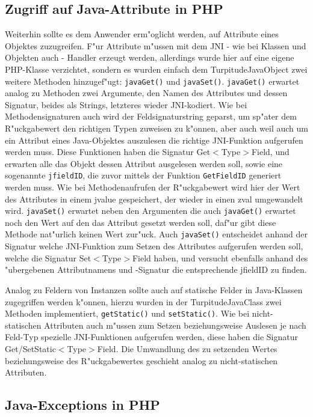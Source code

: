 \subsection{Zugriff auf Java-Attribute in PHP}
\label{sec:chap1:impl:7}

Weiterhin sollte es dem Anwender erm"oglicht werden, auf Attribute eines Objektes zuzugreifen. F"ur Attribute m"ussen mit dem JNI - wie bei Klassen und Objekten auch -
Handler erzeugt werden, allerdings wurde hier auf eine eigene PHP-Klasse verzichtet, sondern es wurden einfach dem TurpitudeJavaObject zwei weitere Methoden hinzugef"ugt: 
\texttt{javaGet()} und \texttt{javaSet()}. \texttt{javaGet()} erwartet analog zu Methoden zwei Argumente, den Namen des Attributes und dessen Signatur, beides als Strings, 
letzteres wieder JNI-kodiert. Wie bei Methodensignaturen auch wird der Feldsignaturstring geparst, um sp"ater dem R"uckgabewert den richtigen Typen zuweisen zu k"onnen, 
aber auch weil auch um ein Attribut eines Java-Objektes auszulesen die richtige JNI-Funktion aufgerufen werden muss. Diese Funktionen haben die Signatur
Get$<$Type$>$Field, und erwarten alle das Objekt dessen Attribut ausgelesen werden soll, sowie eine sogenannte \texttt{jfieldID}, die zuvor mittels der Funktion
\texttt{GetFieldID} generiert werden muss. Wie bei Methodenaufrufen der R"uckgabewert wird hier der Wert des Attributes in einem jvalue gespeichert, der wieder
in einen zval umgewandelt wird. \texttt{javaSet()} erwartet neben den Argumenten die auch \texttt{javaGet()} erwartet noch den Wert auf den das Attribut gesetzt werden
soll, daf"ur gibt diese Methode nat"urlich keinen Wert zur"uck. Auch \texttt{javaSet()} entscheidet anhand der Signatur welche JNI-Funktion zum Setzen des
Attributes aufgerufen werden soll, welche die Signatur Set$<$Type$>$Field haben, und versucht ebenfalls anhand des "ubergebenen Attributnamens und -Signatur die
entsprechende jfieldID zu finden.

Analog zu Feldern von Instanzen sollte auch auf statische Felder in Java-Klassen zugegriffen werden k"onnen, hierzu wurden in der TurpitudeJavaClass zwei Methoden
implementiert, \texttt{getStatic()} und \texttt{setStatic()}. Wie bei nicht-statischen Attributen auch m"ussen zum Setzen beziehungsweise Auslesen je nach Feld-Typ spezielle 
JNI-Funktionen aufgerufen werden, diese haben die Signatur Get/SetStatic$<$Type$>$Field. Die Umwandlung des zu setzenden Wertes beziehungsweise des R"uckgabewertes
geschieht analog zu nicht-statischen Attributen.

\subsection{Java-Exceptions in PHP}
\label{sec:chap1:impl:8}

